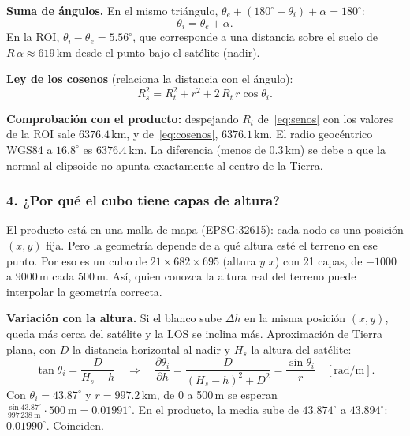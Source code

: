 \documentclass[11pt,a4paper]{article}
\begin{document}
\textbf{Suma de ángulos.} En el mismo triángulo, $\theta_e + (180^\circ - \theta_i) + \alpha = 180^\circ$:
\begin{equation}
  \theta_i = \theta_e + \alpha .
\end{equation}
En la ROI, $\theta_i - \theta_e = 5.56^\circ$, que corresponde a una distancia sobre el suelo de $R\,\alpha \approx 619$\,km desde el
punto bajo el satélite (nadir).

\textbf{Ley de los cosenos} (relaciona la distancia con el ángulo):
\begin{equation}
  R_s^2 = R_t^2 + r^2 + 2\,R_t\, r\cos\theta_i .
  \label{eq:cosenos}
\end{equation}

\textbf{Comprobación con el producto:} despejando $R_t$ de~\eqref{eq:senos} con los valores de la ROI sale $6376.4$\,km, y
de~\eqref{eq:cosenos}, $6376.1$\,km. El radio geocéntrico WGS84 a $16.8^\circ$ es $6376.4$\,km. La diferencia (menos de 0.3\,km) se
debe a que la normal al elipsoide no apunta exactamente al centro de la Tierra.

\subsubsection*{4. ¿Por qué el cubo tiene capas de altura?}

El producto está en una malla de mapa (EPSG:32615): cada nodo es una posición $(x, y)$ fija. Pero la geometría depende de a qué
altura esté el terreno en ese punto. Por eso  es un cubo de $21 \times 682 \times 695$ (altura \por{} $y$ \por{} $x$)
con 21 capas, de $-1000$ a $9000$\,m cada 500\,m. Así, quien conozca la altura real del terreno puede interpolar la geometría
correcta.

\textbf{Variación con la altura.} Si el blanco sube $\Delta h$ en la misma posición $(x,y)$, queda más cerca del satélite y la LOS se
inclina más. Aproximación de Tierra plana, con $D$ la distancia horizontal al nadir y $H_s$ la altura del satélite:
\begin{equation}
  \tan\theta_i = \frac{D}{H_s - h}
  \quad\Longrightarrow\quad
  \frac{\partial\theta_i}{\partial h} = \frac{D}{(H_s-h)^2 + D^2} = \frac{\sin\theta_i}{r}\quad[\text{rad/m}].
\end{equation}
Con $\theta_i = 43.87^\circ$ y $r = 997.2$\,km, de 0 a 500\,m se esperan
$\frac{\sin 43.87^\circ}{997\,238\ \text{m}}\cdot 500\ \text{m} = 0.01991^\circ$. En el producto, la media sube de $43.874^\circ$ a
$43.894^\circ$: $0.01990^\circ$. Coinciden.
\end{document}
